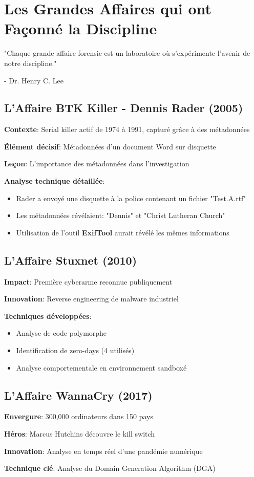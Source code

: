 \chapter{Les Grandes Affaires qui ont Façonné la Discipline}
\epigraph{"Chaque grande affaire forensic est un laboratoire où s'expérimente l'avenir de notre discipline."}{- Dr. Henry C. Lee}
\section{L'Affaire BTK Killer - Dennis Rader (2005)}
\textbf{Contexte}: Serial killer actif de 1974 à 1991, capturé grâce à des métadonnées

\textbf{Élément décisif}: Métadonnées d'un document Word sur disquette

\textbf{Leçon}: L'importance des métadonnées dans l'investigation

\textbf{Analyse technique détaillée}:

\begin{itemize}
\item Rader a envoyé une disquette à la police contenant un fichier "Test.A.rtf"
\item Les métadonnées révélaient: "Dennis" et "Christ Lutheran Church"
\item Utilisation de l'outil \textbf{ExifTool} aurait révélé les mêmes informations
\end{itemize}

\section{L'Affaire Stuxnet (2010)}
\textbf{Impact}: Première cyberarme reconnue publiquement

\textbf{Innovation}: Reverse engineering de malware industriel

\textbf{Techniques développées}:

\begin{itemize}
\item Analyse de code polymorphe
\item Identification de zero-days (4 utilisés)
\item Analyse comportementale en environnement sandboxé
\end{itemize}

\section{L'Affaire WannaCry (2017)}
\textbf{Envergure}: 300,000 ordinateurs dans 150 pays

\textbf{Héros}: Marcus Hutchins découvre le kill switch

\textbf{Innovation}: Analyse en temps réel d'une pandémie numérique

\textbf{Technique clé}: Analyse du Domain Generation Algorithm (DGA)
